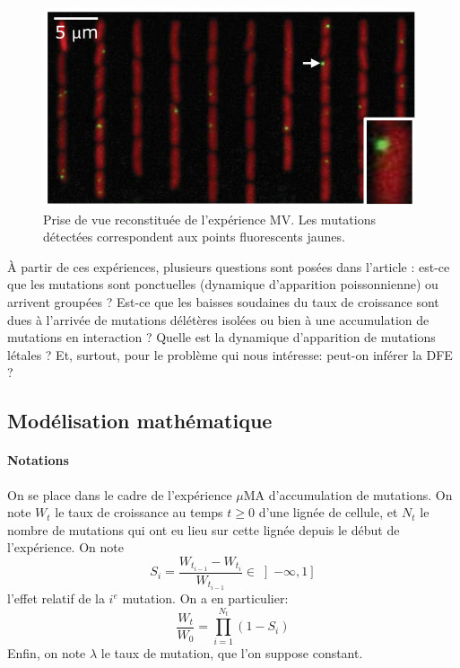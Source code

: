 \documentclass[12pt]{article}
\newcommand{\iof}[1]{\left]#1\right]}
\begin{document}
\begin{figure}[h]
  \begin{center}
    \vspace{3mm}
    \includegraphics[scale=0.5]{../Img/Schema_MV.png}
  \end{center}
  \caption{\label{fig:MV}Prise de vue reconstituée de l'expérience MV. Les mutations détectées correspondent aux points fluorescents jaunes.}
\end{figure}

À partir de ces expériences, plusieurs questions sont posées dans l'article : est-ce que les mutations sont ponctuelles (dynamique d'apparition poissonnienne) ou arrivent groupées ? Est-ce que les baisses soudaines du taux de croissance sont dues à l’arrivée de mutations délétères isolées ou bien à une accumulation de mutations en interaction ? Quelle est la dynamique d’apparition de mutations létales ? Et, surtout, pour le problème qui nous intéresse: peut-on inférer la DFE ?

\subsection{Modélisation mathématique}

\paragraph{Notations}
On se place dans le cadre de l'expérience $\mu$MA d'accumulation de mutations. On note $W_t$ le taux de croissance au temps $t\geqslant 0$ d'une lignée de cellule, et $N_t$ le nombre de mutations qui ont eu lieu sur cette lignée depuis le début de l'expérience. On note \[S_i=\frac{W_{t_{i-1}}-W_{t_i}}{W_{t_{i-1}}}\in\iof{-\infty,1}\] l'effet relatif de la $i^e$ mutation. On a en particulier: 
\begin{equation}\label{mod}
  \frac{W_t}{W_0}=\prod_{i=1}^{N_t}(1-S_i)
\end{equation}
Enfin, on note $\lambda$ le taux de mutation, que l'on suppose constant.
\end{document}
